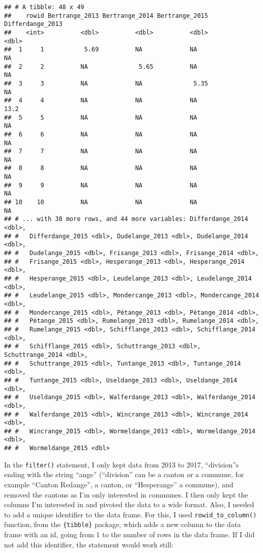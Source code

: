 \documentclass[
]{article}
\begin{document}
\begin{verbatim}
## # A tibble: 48 x 49
##    rowid Bertrange_2013 Bertrange_2014 Bertrange_2015 Differdange_2013
##    <int>          <dbl>          <dbl>          <dbl>            <dbl>
##  1     1           5.69          NA             NA                NA  
##  2     2          NA              5.65          NA                NA  
##  3     3          NA             NA              5.35             NA  
##  4     4          NA             NA             NA                13.2
##  5     5          NA             NA             NA                NA  
##  6     6          NA             NA             NA                NA  
##  7     7          NA             NA             NA                NA  
##  8     8          NA             NA             NA                NA  
##  9     9          NA             NA             NA                NA  
## 10    10          NA             NA             NA                NA  
## # ... with 38 more rows, and 44 more variables: Differdange_2014 <dbl>,
## #   Differdange_2015 <dbl>, Dudelange_2013 <dbl>, Dudelange_2014 <dbl>,
## #   Dudelange_2015 <dbl>, Frisange_2013 <dbl>, Frisange_2014 <dbl>,
## #   Frisange_2015 <dbl>, Hesperange_2013 <dbl>, Hesperange_2014 <dbl>,
## #   Hesperange_2015 <dbl>, Leudelange_2013 <dbl>, Leudelange_2014 <dbl>,
## #   Leudelange_2015 <dbl>, Mondercange_2013 <dbl>, Mondercange_2014 <dbl>,
## #   Mondercange_2015 <dbl>, Pétange_2013 <dbl>, Pétange_2014 <dbl>,
## #   Pétange_2015 <dbl>, Rumelange_2013 <dbl>, Rumelange_2014 <dbl>,
## #   Rumelange_2015 <dbl>, Schifflange_2013 <dbl>, Schifflange_2014 <dbl>,
## #   Schifflange_2015 <dbl>, Schuttrange_2013 <dbl>, Schuttrange_2014 <dbl>,
## #   Schuttrange_2015 <dbl>, Tuntange_2013 <dbl>, Tuntange_2014 <dbl>,
## #   Tuntange_2015 <dbl>, Useldange_2013 <dbl>, Useldange_2014 <dbl>,
## #   Useldange_2015 <dbl>, Walferdange_2013 <dbl>, Walferdange_2014 <dbl>,
## #   Walferdange_2015 <dbl>, Wincrange_2013 <dbl>, Wincrange_2014 <dbl>,
## #   Wincrange_2015 <dbl>, Wormeldange_2013 <dbl>, Wormeldange_2014 <dbl>,
## #   Wormeldange_2015 <dbl>
\end{verbatim}

In the \texttt{filter()} statement, I only kept data from 2013 to 2017, ``division''s ending with the string ``ange''
(``division'' can be a canton or a commune, for example ``Canton Redange'', a canton, or ``Hesperange'' a commune),
and removed the cantons as I'm only interested in communes.
I then only kept the columns I'm interested in and pivoted the data to a wide format.
Also, I needed to add a unique identifier to the data frame. For this, I used \texttt{rowid\_to\_column()} function,
from the \texttt{\{tibble\}} package, which adds a new column to the data frame with an id, going from 1 to
the number of rows in the data frame. If I did not add this identifier, the statement would work still:
\end{document}
